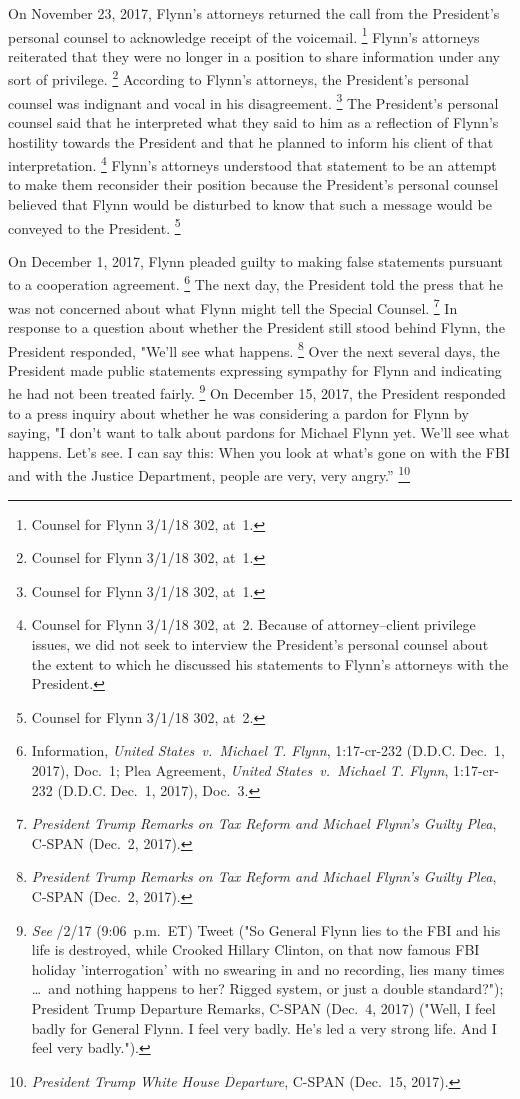 {On November 23, 2017, Flynn's attorneys returned the call from the President's personal counsel to acknowledge receipt of the voicemail.%
\footnote{Counsel for Flynn 3/1/18 302, at~1.}
Flynn's attorneys reiterated that they were no longer in a position to share information under any sort of privilege.%
\footnote{Counsel for Flynn 3/1/18 302, at~1.}
According to Flynn's attorneys, the President's personal counsel was indignant and vocal in his disagreement.%
\footnote{Counsel for Flynn 3/1/18 302, at~1.}
The President's personal counsel said that he interpreted what they said to him as a reflection of Flynn's hostility towards the President and that he planned to inform his client of that interpretation.%
\footnote{Counsel for Flynn 3/1/18 302, at~2.
Because of attorney--client privilege issues, we did not seek to interview the President's personal counsel about the extent to which he discussed his statements to Flynn's attorneys with the President.}
Flynn's attorneys understood that statement to be an attempt to make them reconsider their position because the President's personal counsel believed that Flynn would be disturbed to know that such a message would be conveyed to the President.%
\footnote{Counsel for Flynn 3/1/18 302, at~2.}

On December 1, 2017, Flynn pleaded guilty to making false statements pursuant to a cooperation agreement.%
\footnote{Information, \textit{United States~v.\ Michael T. Flynn}, 1:17-cr-232 (D.D.C. Dec.~1, 2017), Doc.~1;
Plea Agreement, \textit{United States~v.\ Michael T. Flynn}, 1:17-cr-232 (D.D.C. Dec.~1, 2017), Doc.~3.}
The next day, the President told the press that he was not concerned about what Flynn might tell the Special Counsel.%
\footnote{\textit{President Trump Remarks on Tax Reform and Michael Flynn's Guilty Plea}, C-SPAN (Dec.~2, 2017).}
In response to a question about whether the President still stood behind Flynn, the President responded, "We'll see what happens.%
\footnote{\textit{President Trump Remarks on Tax Reform and Michael Flynn's Guilty Plea}, C-SPAN (Dec.~2, 2017).}
Over the next several days, the President made public statements expressing sympathy for Flynn and indicating he had not been treated fairly.%
\footnote{\textit{See} /2/17 (9:06~p.m.~ET) Tweet ("So General Flynn lies to the FBI and his life is destroyed, while Crooked Hillary Clinton, on that now famous FBI holiday 'interrogation' with no swearing in and no recording, lies many times \dots\ and nothing happens to her?
Rigged system, or just a double standard?");
President Trump Departure Remarks, C-SPAN (Dec.~4, 2017) ("Well, I feel badly for General Flynn.
I feel very badly.
He's led a very strong life.
And I feel very badly.").}
On December 15, 2017, the President responded to a press inquiry about whether he was considering a pardon for Flynn by saying, "I don't want to talk about pardons for Michael Flynn yet.
We'll see what happens.
Let's see.
I can say this: When you look at what's gone on with the FBI and with the Justice Department, people are very, very angry.''%
\footnote{\textit{President Trump White House Departure}, C-SPAN (Dec.~15, 2017).}

}
